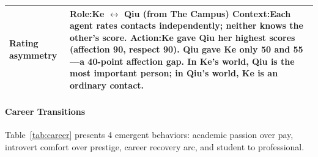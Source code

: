 \begin{table}[t]
\begin{tabular}{p{0.8in}p{4.3in}}
Rating \newline asymmetry
&
\textbf{Role:}\quad Ke $\leftrightarrow$ Qiu \hfill (from The Campus) \newline
\textbf{Context:}\quad Each agent rates contacts independently; neither knows the other's score. \newline
\textbf{Action:}\quad Ke gave Qiu her highest scores (affection 90, respect 90). Qiu gave Ke only 50 and 55---\textbf{a 40-point affection gap}. In Ke's world, Qiu is the most important person; in Qiu's world, Ke is an ordinary contact.
\\
\bottomrule
\end{tabular}
\end{table}

\paragraph{Career Transitions}
Table~\ref{tab:career} presents 4 emergent behaviors:
academic passion over pay, introvert comfort over prestige, career recovery arc, and student to professional.

